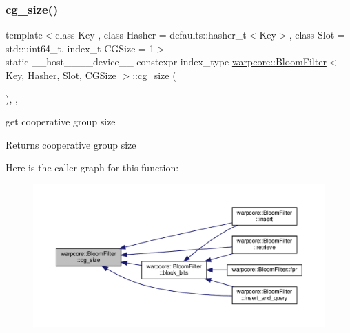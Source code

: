 \subsubsection{\texorpdfstring{cg\+\_\+size()}{cg\_size()}}
{\footnotesize\ttfamily template$<$class Key , class Hasher  = defaults\+::hasher\+\_\+t$<$\+Key$>$, class Slot  = std\+::uint64\+\_\+t, index\+\_\+t C\+G\+Size = 1$>$ \\
static \+\_\+\+\_\+host\+\_\+\+\_\+\+\_\+\+\_\+device\+\_\+\+\_\+ constexpr index\+\_\+type \hyperlink{classwarpcore_1_1BloomFilter}{warpcore\+::\+Bloom\+Filter}$<$ Key, Hasher, Slot, C\+G\+Size $>$\+::cg\+\_\+size (\begin{DoxyParamCaption}{ }\end{DoxyParamCaption})\hspace{0.3cm}{\ttfamily [inline]}, {\ttfamily [static]}, {\ttfamily [noexcept]}}



get cooperative group size 

\begin{DoxyReturn}{Returns}
cooperative group size 
\end{DoxyReturn}
Here is the caller graph for this function\+:
\nopagebreak
\begin{figure}[H]
\begin{center}
\leavevmode
\includegraphics[width=350pt]{classwarpcore_1_1BloomFilter_a6ad2335811852ad62fc65e85416d3904_icgraph}
\end{center}
\end{figure}
\mbox{\label{classwarpcore_1_1BloomFilter_af77c52ec3c2223cfe335a65197bed625}} 
